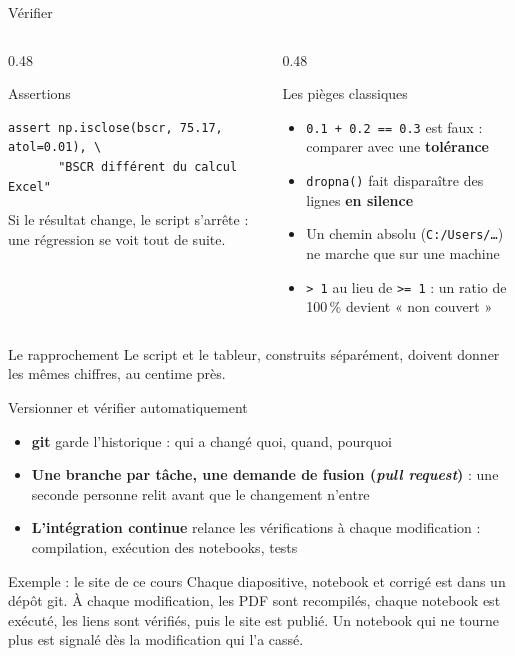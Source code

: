 \documentclass[10pt,aspectratio=169]{beamer}
\newcommand{\fx}[1]{\texttt{\small #1}}
\begin{document}
\begin{frame}[fragile]{Vérifier}
\begin{columns}[T]
\begin{column}{0.48\textwidth}
\begin{block}{Assertions}
\begin{lstlisting}
assert np.isclose(bscr, 75.17, atol=0.01), \
       "BSCR différent du calcul Excel"
\end{lstlisting}
\small Si le résultat change, le script s'arrête : une régression se voit tout de suite.
\end{block}
\end{column}
\begin{column}{0.48\textwidth}
\begin{block}{Les pièges classiques}
\small
\begin{itemize}
  \item \fx{0.1 + 0.2 == 0.3} est faux : comparer avec une \textbf{tolérance}
  \item \fx{dropna()} fait disparaître des lignes \textbf{en silence}
  \item Un chemin absolu (\fx{C:/Users/…}) ne marche que sur une machine
  \item \fx{> 1} au lieu de \fx{>= 1} : un ratio de 100\,\% devient « non couvert »
\end{itemize}
\end{block}
\end{column}
\end{columns}
\vspace{0.2cm}
\begin{alertblock}{Le rapprochement}
Le script et le tableur, construits séparément, doivent donner les mêmes chiffres, au centime près.
\end{alertblock}
\end{frame}

\begin{frame}{Versionner et vérifier automatiquement}
\begin{itemize}
  \item \textbf{git} garde l'historique : qui a changé quoi, quand, pourquoi
  \item \textbf{Une branche par tâche, une demande de fusion (\emph{pull request})} : une seconde personne relit avant que le changement n'entre
  \item \textbf{L'intégration continue} relance les vérifications à chaque modification : compilation, exécution des notebooks, tests
\end{itemize}
\vspace{0.3cm}
\begin{block}{Exemple : le site de ce cours}
Chaque diapositive, notebook et corrigé est dans un dépôt git. À chaque modification, les PDF sont
recompilés, chaque notebook est exécuté, les liens sont vérifiés, puis le site est publié. Un
notebook qui ne tourne plus est signalé dès la modification qui l'a cassé.
\end{block}
\end{frame}
\end{document}
